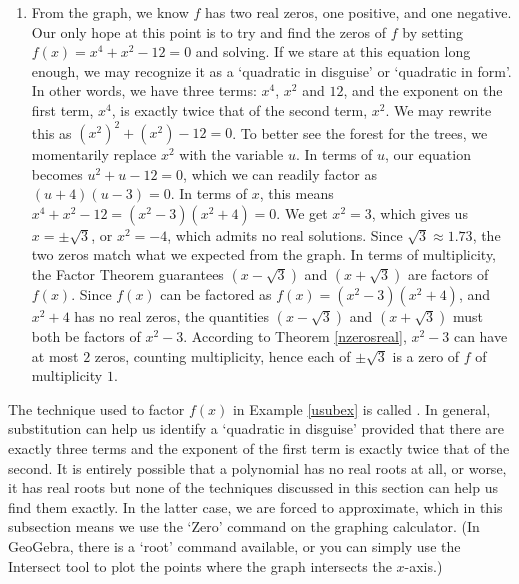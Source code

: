 {\begin{enumerate}
\item  From the graph, we know $f$ has two real zeros, one positive, and one negative.  Our only hope at this point is to try and find the zeros of $f$ by setting $f(x)=x^4+x^2-12=0$ and solving.  If we stare at this equation long enough, we may recognize it as a `quadratic in disguise' or `quadratic in form'.   In other words, we have three terms: $x^4$, $x^2$ and $12$, and the exponent on the first term, $x^4$, is exactly twice that of the second term, $x^2$.  We may rewrite this as $\left(x^2\right)^2 + \left(x^2\right) - 12 = 0$.  To better see the forest for the trees, we momentarily replace $x^2$ with the variable $u$.  In terms of $u$, our equation becomes $u^2 + u - 12 = 0$, which we can readily factor as $(u+4)(u-3) = 0$.  In terms of $x$, this means $x^4+x^2-12= \left(x^2-3\right) \left(x^2 + 4 \right)=0$. We get $x^2 = 3$, which gives us $x = \pm \sqrt{3}$, or $x^2=-4$, which admits no real solutions.  Since $\sqrt{3} \approx 1.73$, the two zeros match what we expected from the graph.  In terms of multiplicity, the Factor Theorem guarantees $\left(x - \sqrt{3}\right)$ and $\left(x + \sqrt{3}\right)$ are factors of $f(x)$.  Since $f(x)$ can be factored as $f(x) = \left(x^2-3\right) \left(x^2 + 4 \right)$, and $x^2 + 4$ has no real zeros, the quantities $\left(x - \sqrt{3}\right)$ and $\left(x + \sqrt{3}\right)$ must both be factors of $x^2-3$.  According to Theorem \ref{nzerosreal}, $x^2-3$ can have at most $2$ zeros, counting multiplicity, hence each of $\pm \sqrt{3}$ is a zero of $f$ of multiplicity $1$. 

\end{enumerate}
}

\medskip

The technique used to factor $f(x)$ in Example \ref{usubex} is called  .   In general, substitution can help us identify a `quadratic in disguise' provided that there are exactly three terms and the exponent of the first term is exactly twice that of the second.  It is entirely possible that a polynomial has no real roots at all, or worse, it has real roots but none of the techniques discussed in this section can help us find them exactly.  In the latter case, we are forced to approximate, which in this subsection means we use the `Zero' command on the graphing calculator.  (In GeoGebra, there is a `root' command available, or you can simply use the Intersect tool to plot the points where the graph intersects the $x$-axis.)



